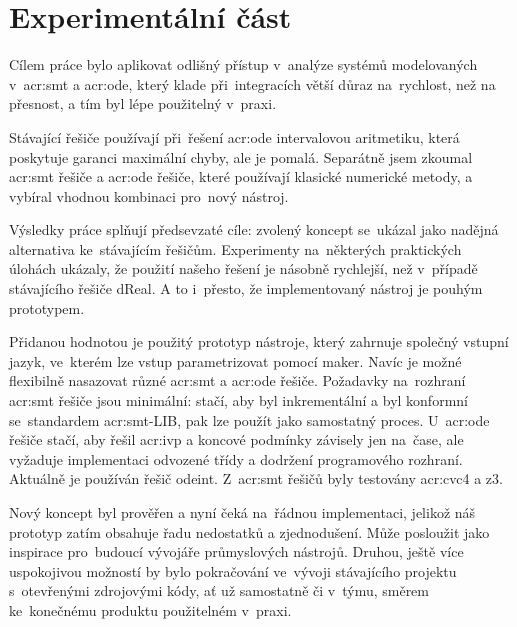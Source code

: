 \documentclass[thesis=M,czech]{FITthesis}[2012/06/26]
\newcommand{\acrlabel}[1]{acr:#1}
\newcommand{\acr}[1]{\acrshort{\acrlabel{#1}}}
\begin{document}
\chapter{Experimentální část}\label{ch:exp}


\begin{conclusion}\label{ch:outro}
Cílem práce bylo aplikovat odlišný přístup
v~analýze systémů modelovaných
v~\acr{smt} a \acr{ode},
který klade při~integracích větší
důraz na~rychlost, než na přesnost,
a tím byl lépe použitelný v~praxi.

Stávající řešiče používají při~řešení \acr{ode}
intervalovou aritmetiku, která poskytuje
garanci maximální chyby,
ale je pomalá.
Separátně jsem zkoumal \acr{smt} řešiče
a \acr{ode} řešiče, které používají
klasické numerické metody,
a vybíral vhodnou kombinaci
pro~nový nástroj.

Výsledky práce splňují předsevzaté cíle:
zvolený koncept se~ukázal jako nadějná
alternativa ke~stávajícím řešičům.
Experimenty na~některých
praktických úlohách ukázaly,
že použití našeho řešení
je násobně rychlejší,
než v~případě stávajícího řešiče dReal.
A to i~přesto, že implementovaný nástroj
je pouhým prototypem.

Přidanou hodnotou je použitý prototyp nástroje,
který zahrnuje společný vstupní jazyk,
ve~kterém lze vstup parametrizovat pomocí maker.
Navíc je možné flexibilně
nasazovat různé \acr{smt} a \acr{ode} řešiče.
Požadavky na~rozhraní \acr{smt} řešiče
jsou minimální: stačí, aby byl inkrementální
a byl konformní se~standardem \acr{smt}-LIB,
pak lze použít jako samostatný proces.
U~\acr{ode} řešiče stačí, aby řešil \acr{ivp}
a koncové podmínky závisely jen na~čase,
ale vyžaduje implementaci
odvozené třídy a dodržení programového rozhraní.
Aktuálně je používán řešič odeint.
Z~\acr{smt} řešičů byly testovány
\acr{cvc}4 a z3.

Nový koncept byl prověřen a nyní čeká
na~řádnou implementaci,
jelikož náš prototyp zatím obsahuje řadu nedostatků a zjednodušení.
Může posloužit jako inspirace pro~budoucí vývojáře
průmyslových nástrojů.
Druhou, ještě více uspokojivou možností
by bylo pokračování ve~vývoji stávajícího projektu
s~otevřenými zdrojovými kódy,
ať už samostatně či v~týmu,
směrem ke~konečnému produktu použitelném v~praxi.
\end{conclusion}
\end{document}
